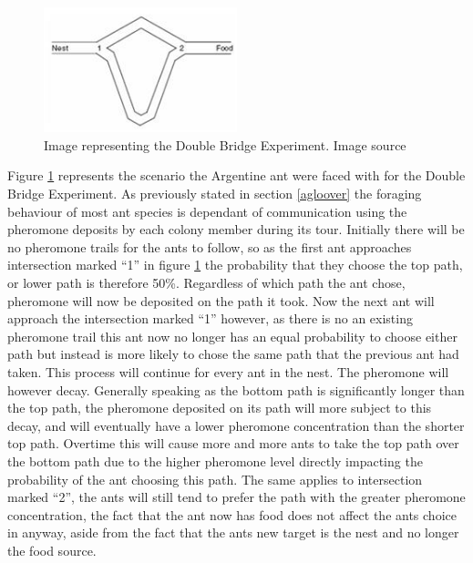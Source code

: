 \begin{figure}[h!]
\centering
\includegraphics[width=0.5\textwidth]{Images/chapter1/doublebridge}
\caption{Image representing the Double Bridge Experiment. Image source \cite{doublebridges:image}}
\label{fig:doublebridge}
\end{figure}

\noindent
Figure \ref{fig:doublebridge} represents the scenario the Argentine ant were faced with for the Double Bridge Experiment. As previously stated in section \ref{agloover} the foraging behaviour of most ant species is dependant of communication using the pheromone deposits by each colony member during its tour. Initially there will be no pheromone trails for the ants to follow, so as the first ant approaches intersection marked \enquote{1} in figure \ref{fig:doublebridge} the probability that they choose the top path, or lower path is therefore 50\%. Regardless of which path the ant chose, pheromone will now be deposited on the path it took. Now the next ant will approach the intersection marked \enquote{1} however, as there is no an existing pheromone trail this ant now no longer has an equal probability to choose either path but instead is more likely to chose the same path that the previous ant had taken. This process will continue for every ant in the nest. The pheromone will however decay. Generally speaking as the bottom path is significantly longer than the top path, the pheromone deposited on its path will more subject to this decay, and will eventually have a lower pheromone concentration than the shorter top path. Overtime this will cause more and more ants to take the top path over the bottom path due to the higher pheromone level directly impacting the probability of the ant choosing this path. The same applies to intersection marked \enquote{2}, the ants will still tend to prefer the path with the greater pheromone concentration, the fact that the ant now has food does not affect the ants choice in anyway, aside from the fact that the ants new target is the nest and no longer the food source.

